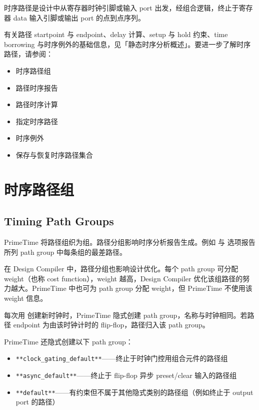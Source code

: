 \label{chap:paths}

时序路径是设计中从寄存器时钟引脚或输入 port 出发，经组合逻辑，终止于寄存器 data 输入引脚或输出 port 的点到点序列。

有关路径 startpoint 与 endpoint、delay 计算、setup 与 hold 约束、time borrowing 与时序例外的基础信息，见「静态时序分析概述」。要进一步了解时序路径，请参阅：
\begin{itemize}
  \item 时序路径组
  \item 路径时序报告
  \item 路径时序计算
  \item 指定时序路径
  \item 时序例外
  \item 保存与恢复时序路径集合
\end{itemize}

\section{时序路径组}
\subsection*{Timing Path Groups}

PrimeTime 将路径组织为组。路径分组影响时序分析报告生成。例如  与  选项报告所列 path group 中每条组的最差路径。

在 Design Compiler 中，路径分组也影响设计优化。每个 path group 可分配 weight（也称 cost function），weight 越高，Design Compiler 优化该组路径的努力越大。PrimeTime 中也可为 path group 分配 weight，但 PrimeTime 不使用该 weight 信息。

每次用  创建新时钟时，PrimeTime 隐式创建 path group，名称与时钟相同。若路径 endpoint 为由该时钟计时的 flip-flop，路径归入该 path group。

PrimeTime 还隐式创建以下 path group：
\begin{itemize}
  \item \texttt{**clock\_gating\_default**}——终止于时钟门控用组合元件的路径组
  \item \texttt{**async\_default**}——终止于 flip-flop 异步 preset/clear 输入的路径组
  \item \texttt{**default**}——有约束但不属于其他隐式类别的路径组（例如终止于 output port 的路径）
\end{itemize}

